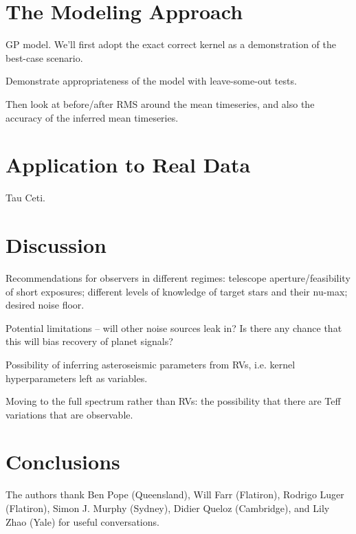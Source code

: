 \documentclass[modern]{aastex62}
\begin{document}
\section{The Modeling Approach}
\label{s:modeling}

GP model. We'll first adopt the exact correct kernel as a demonstration of the best-case scenario.

Demonstrate appropriateness of the model with leave-some-out tests.

Then look at before/after RMS around the mean timeseries, and also the accuracy of the inferred mean timeseries.

\section{Application to Real Data}

\EXPRES Tau Ceti.

\section{Discussion}

Recommendations for observers in different regimes: telescope aperture/feasibility of short exposures; different levels of knowledge of target stars and their nu-max; desired noise floor.

Potential limitations -- will other noise sources leak in? Is there any chance that this will bias recovery of planet signals?

Possibility of inferring asteroseismic parameters from RVs, i.e. kernel hyperparameters left as variables.

Moving to the full spectrum rather than RVs: the possibility that there are Teff variations that are observable.

\section{Conclusions}

\acknowledgements

The authors thank
  Ben Pope (Queensland),
  Will Farr (Flatiron),
  Rodrigo Luger (Flatiron),
  Simon J. Murphy (Sydney),
  Didier Queloz (Cambridge), and
  Lily Zhao (Yale)
for useful conversations.



\clearpage


\end{document}

